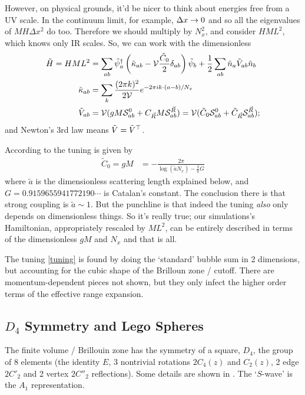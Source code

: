 However, on physical grounds, it'd be nicer to think about energies free from a UV scale.
In the continuum limit, for example, $\Delta x\rightarrow 0$ and so all the eigenvalues of $MH \Delta x^2$ do too.
Therefore we should multiply by $N_x^2$, and consider $H ML^2$, which knows only IR scales.
So, we can work with the dimensionless
\begin{align}
	\tilde{H} = HML^2 &= 
		\sum_{ab} \tilde{\psi}{}^{\dagger}_a \left(
			\tilde{\kappa}_{ab}
			- \mathcal{V} \frac{\tilde{C}_0}{2} \delta_{ab}
			\right) \tilde{\psi}_b
		+ \frac{1}{2} \sum_{ab} \tilde{n}_a \tilde{V}_{ab} \tilde{n}_b
\label{eq:dimensionless hamiltonian}
\\
	\tilde{\kappa}_{ab} &=
				\sum_{k} \frac{(2\pi k)^2}{2 \mathcal{V}} e^{-2\pi i k \cdot(a-b)/N_x} 
\\
	\tilde{V}_{ab} &= 
				\mathcal{V}(gM \mathcal{S}^{0}_{ab}
				+ C_{\vec{R}} M \mathcal{S}^{\vec{R}}_{ab})
				=
				\mathcal{V}(\tilde{C}_0 \mathcal{S}^{0}_{ab}
				+ \tilde{C}_{\vec{R}} \mathcal{S}^{\vec{R}}_{ab});
\label{eq:dimensionless potential}
\end{align}
and Newton's 3rd law means $\tilde{V}=\tilde{V}{}^{\top}$.

According to  the tuning is given by
\begin{align}
	\tilde{C}_0 = gM &= - \frac{2\pi}{\log\left(\tilde{a} N_x\right) - \frac{2}{\pi}G}
	\label{eq:tuning}
\end{align}
where $\tilde{a}$ is the dimensionless scattering length explained below, and $G=0.9159655941772190\cdots$ is Catalan's constant.
The conclusion there is that strong coupling is $\tilde{a}\sim 1$.
But the punchline is that indeed the tuning \emph{also} only depends on dimensionless things.
So it's really true; our simulations's Hamiltonian, appropriately rescaled by $ML^2$, can be entirely described in terms of the dimensionless $gM$ and $N_x$ and that is all.

The tuning \eqref{tuning} is found by doing the `standard' bubble sum in 2 dimensions, but accounting for the cubic shape of the Brilloun zone / cutoff.
There are momentum-dependent pieces not shown, but they only infect the higher order terms of the effective range expansion.

\subsection{$D_4$ Symmetry and Lego Spheres}

The finite volume / Brillouin zone has the symmetry of a square, $D_4$, the group of 8 elements (the identity $E$, 3 nontrivial rotations $2C_4(z)$ and $C_2(z)$, 2 edge $2C'_2$ and 2 vertex $2C''_2$ reflections).
Some details are shown in .
The `$S$-wave' is the $A_1$ representation.

